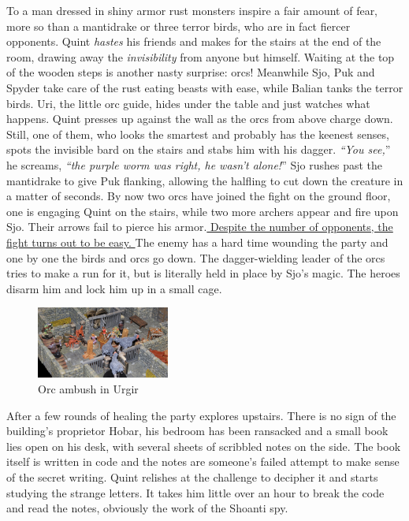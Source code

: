 To a man dressed in shiny armor rust monsters inspire a fair amount of fear, more so than a mantidrake or three terror birds, who are in fact fiercer opponents. Quint {\itshape hastes} his friends and makes for the stairs at the end of the room, drawing away the  {\itshape invisibility} from anyone but himself. Waiting at the top of the wooden steps is another nasty surprise: orcs! Meanwhile Sjo, Puk and Spyder take care of the rust eating beasts with ease, while Balian tanks the terror birds. Uri, the little orc guide, hides under the table and just watches what happens. Quint presses up against the wall as the orcs from above charge down. Still, one of them, who looks the smartest and probably has the keenest senses, spots the invisible bard on the stairs and stabs him with his dagger. {\itshape``You see,}'' he screams, {\itshape``the purple worm was right, he wasn't alone!}'' Sjo rushes past the mantidrake to give Puk flanking, allowing the halfling to cut down the creature in a matter of seconds. By now two orcs have joined the fight on the ground floor, one is engaging Quint on the stairs, while two more archers appear and fire upon Sjo. Their arrows fail to pierce his armor.\hyperref[fig:Orc-ambush-in-Urgir-593345070]{ Despite the number of opponents, the fight turns out to be easy. } The enemy has a hard time wounding the party and one by one the birds and orcs go down. The dagger-wielding leader of the orcs tries to make a run for it, but is literally held  in place by Sjo's magic. The heroes disarm him and lock him up in a small cage. \\

\begin{figure}[h]
	\centering
	\includegraphics[width=0.39\textwidth]{images/Orc-ambush-in-Urgir-593345070.jpg}
	\caption{Orc ambush in Urgir}
	\label{fig:Orc-ambush-in-Urgir-593345070}
\end{figure}

After a few rounds of healing the party explores upstairs. There is no sign of the building's proprietor Hobar, his bedroom has been ransacked and a small book lies open on his desk, with several sheets of scribbled notes on the side. The book itself is written in code and the notes are someone's failed attempt to make sense of the secret writing. Quint relishes at the challenge to decipher it and starts studying the strange letters. It takes him little over an hour to break the code and read the notes, obviously the work of the Shoanti spy.\\

